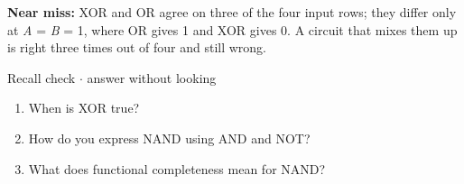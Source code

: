 \documentclass[11pt]{article}
\begin{document}
\begin{keepsection}
\begin{keepsection}
\begin{notebox}\textbf{Near miss:} XOR and OR agree on three of the four input rows; they differ only at \textit{A} = \textit{B} = 1, where OR gives 1 and XOR gives 0. A circuit that mixes them up is right three times out of four and still wrong.\end{notebox}

\begin{recallbox}{Recall check \ensuremath{\cdot} answer without looking}
\begin{enumerate}
\item When is XOR true?
\item How do you express NAND using AND and NOT?
\item What does functional completeness mean for NAND?
\end{enumerate}

\end{recallbox}
\end{keepsection}
\end{keepsection}
\end{document}
